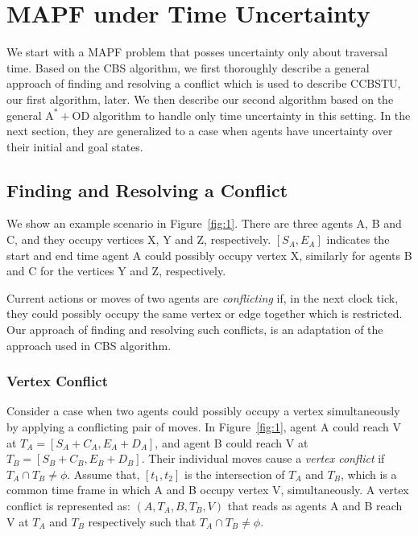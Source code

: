 \documentclass{article}
\begin{document}
\section{MAPF under Time Uncertainty}
We start with a MAPF problem that posses uncertainty only about traversal time. Based on the CBS algorithm, we first thoroughly describe a general approach of finding and resolving a conflict which is used to describe CCBSTU, our first algorithm, later. 
We then describe our second algorithm based on the general $\mathrm{A^* + OD}$ algorithm to handle only time uncertainty in this setting. In the next section, they are generalized to a case when agents have uncertainty over their initial and goal states.

\subsection{Finding and Resolving a Conflict}
We show an example scenario in Figure~\ref{fig:1}.
There are three agents A, B and C, and they occupy vertices X, Y and Z, respectively. $[S_A,E_A]$ indicates the start and end time agent A could possibly occupy vertex X, similarly for agents B and C for the vertices Y and Z, respectively. 

Current actions or moves of two agents are \emph{conflicting} if, in the next clock tick, they could possibly occupy the same vertex or edge together which is restricted. 
Our approach of finding and resolving such conflicts, is an adaptation of the approach used in CBS algorithm. 

\subsubsection{Vertex Conflict}
Consider a case when two agents could possibly occupy a vertex simultaneously by applying a conflicting pair of moves. In Figure~\ref{fig:1}, agent A could reach V at $T_A = [S_A+C_A, E_A+D_A]$, and agent B could reach V at $T_B = [S_B+C_B, E_B+D_B]$. Their individual moves cause a \emph{vertex conflict} if $T_A \cap T_B \neq \phi$. Assume that, $[t_1,t_2]$ is the intersection of $T_A$ and $T_B$, which is a common time frame in which A and B occupy vertex V, simultaneously. 
A vertex conflict is represented as: $(A,T_A,B,T_B,V)$ that reads as agents A and B reach V at $T_A$ and $T_B$ respectively such that $T_A \cap T_B \neq \phi$.
\end{document}
